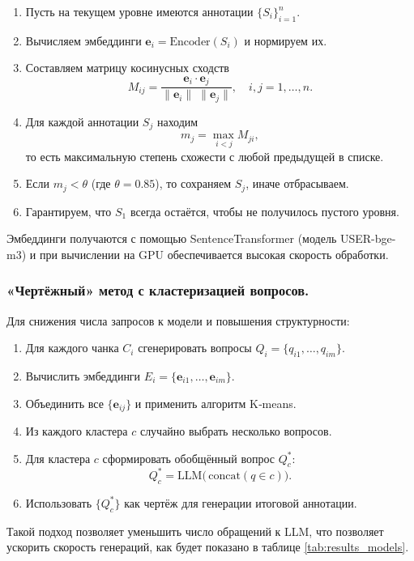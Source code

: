 \documentclass{article}
\theoremstyle{definition}
\theoremstyle{plain}
\begin{document}
\begin{enumerate}
  \item Пусть на текущем уровне имеются аннотации $\{S_i\}_{i=1}^n$.
  \item Вычисляем эмбеддинги $\mathbf{e}_i = \mathrm{Encoder}(S_i)$ и нормируем их.
  \item Составляем матрицу косинусных сходств
    \[
      M_{ij} = \frac{\mathbf{e}_i \cdot \mathbf{e}_j}{\|\mathbf{e}_i\|\;\|\mathbf{e}_j\|},
      \quad i,j=1,\dots,n.
    \]
  \item Для каждой аннотации $S_j$ находим
    \[
      m_j = \max_{\,i<j} M_{ji},
    \]
    то есть максимальную степень схожести с любой предыдущей в списке.
  \item Если $m_j < \theta$ (где $\theta=0.85$), то сохраняем $S_j$, иначе отбрасываем.
  \item Гарантируем, что $S_1$ всегда остаётся, чтобы не получилось пустого уровня.
\end{enumerate}
Эмбеддинги получаются с помощью SentenceTransformer (модель USER-bge-m3) и при вычислении на GPU обеспечивается высокая скорость обработки.

\subsubsection*{«Чертёжный» метод с кластеризацией вопросов.}
Для снижения числа запросов к модели и повышения структурности:
\begin{enumerate}
  \item Для каждого чанка $C_i$ сгенерировать вопросы $Q_i = \{q_{i1},\dots,q_{im}\}$.
  \item Вычислить эмбеддинги $E_i = \{\mathbf{e}_{i1},\dots,\mathbf{e}_{im}\}$.
  \item Объединить все $\{\mathbf{e}_{ij}\}$ и применить алгоритм K‑means.
  \item Из каждого кластера $c$ случайно выбрать несколько вопросов.
  \item Для кластера $c$ сформировать обобщённый вопрос $Q_c^*$:
    \[
      Q_c^* = \mathrm{LLM}\bigl(\,\text{concat}(q\in c)\bigr).
    \]
  \item Использовать $\{Q_c^*\}$ как чертёж для генерации итоговой аннотации.
\end{enumerate}

Такой подход позволяет уменьшить число обращений к LLM, что позволяет ускорить скорость генераций, как будет показано в таблице \ref{tab:results_models}.
\end{document}
